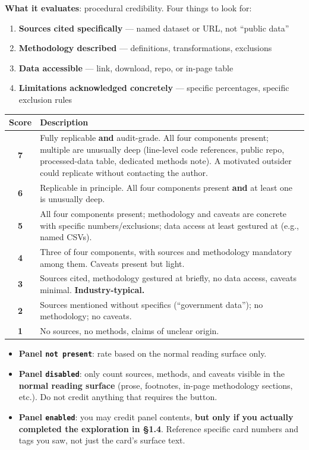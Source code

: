 \begin{tcolorbox}[promptbox, title={Rubric Evaluation scoring guideline}]
\textbf{What it evaluates}: procedural credibility. Four things to look for:
\begin{enumerate}
\item \textbf{Sources cited specifically} --- named dataset or URL, not ``public data''
\item \textbf{Methodology described} --- definitions, transformations, exclusions
\item \textbf{Data accessible} --- link, download, repo, or in-page table
\item \textbf{Limitations acknowledged concretely} --- specific percentages, specific exclusion rules
\end{enumerate}
\begin{center}
\small
\begin{tabularx}{\linewidth}{cX}
\toprule
Score & Description \\
\midrule
\textbf{7} & Fully replicable \textbf{and} audit-grade. All four components present; multiple are unusually deep (line-level code references, public repo, processed-data table, dedicated methods note). A motivated outsider could replicate without contacting the author. \\
\textbf{6} & Replicable in principle. All four components present \textbf{and} at least one is unusually deep. \\
\textbf{5} & All four components present; methodology and caveats are concrete with specific numbers/exclusions; data access at least gestured at (e.g., named CSVs). \\
\textbf{4} & Three of four components, with sources and methodology mandatory among them. Caveats present but light. \\
\textbf{3} & Sources cited, methodology gestured at briefly, no data access, caveats minimal. \textbf{Industry-typical.} \\
\textbf{2} & Sources mentioned without specifics (``government data''); no methodology; no caveats. \\
\textbf{1} & No sources, no methods, claims of unclear origin. \\
\bottomrule
\end{tabularx}
\end{center}

\begin{itemize}
\item \textbf{Panel \texttt{not present}}: rate based on the normal reading surface only.
\item \textbf{Panel \texttt{disabled}}: only count sources, methods, and caveats visible in the \textbf{normal reading surface} (prose, footnotes, in-page methodology sections, etc.). Do not credit anything that requires the \faSearch{} button.
\item \textbf{Panel \texttt{enabled}}: you may credit panel contents, \textbf{but only if you actually completed the exploration in \S1.4}. Reference specific card numbers and tags you saw, not just the card's surface text.
\end{itemize}


\end{tcolorbox}
